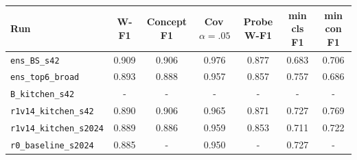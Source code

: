 \begin{tabular}{lcccccc}\toprule
Run & W-F1 & Concept F1 & Cov\,$\alpha=.05$ & Probe W-F1 & min cls F1 & min con F1 \\\midrule
\texttt{ens\_BS\_s42} & 0.909 & 0.906 & 0.976 & 0.877 & 0.683 & 0.706 \\
\texttt{ens\_top6\_broad} & 0.893 & 0.888 & 0.957 & 0.857 & 0.757 & 0.686 \\
\texttt{B\_kitchen\_s42} & - & - & - & - & - & - \\
\texttt{r1v14\_kitchen\_s42} & 0.890 & 0.906 & 0.965 & 0.871 & 0.727 & 0.769 \\
\texttt{r1v14\_kitchen\_s2024} & 0.889 & 0.886 & 0.959 & 0.853 & 0.711 & 0.722 \\
\texttt{r0\_baseline\_s2024} & 0.885 & - & 0.950 & - & 0.727 & - \\
\bottomrule\end{tabular}